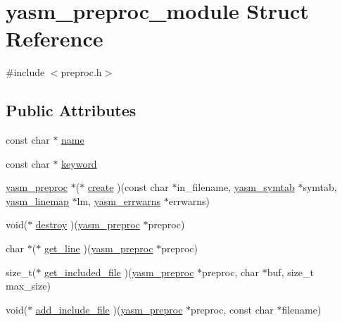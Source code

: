 \hypertarget{structyasm__preproc__module}{\section{yasm\-\_\-preproc\-\_\-module Struct Reference}
\label{structyasm__preproc__module}
}


{\ttfamily \#include $<$preproc.\-h$>$}

\subsection*{Public Attributes}
\begin{DoxyCompactItemize}
\item 
const char $\ast$ \hyperlink{structyasm__preproc__module_ae232113acc58ef454e6c6df75abc6ce7}{name}
\item 
const char $\ast$ \hyperlink{structyasm__preproc__module_ad37fee1370d76ddbcbea80b17be3fc83}{keyword}
\item 
\hyperlink{coretype_8h_aa84094d121bb4afca049e6c35efc2c92}{yasm\-\_\-preproc} $\ast$($\ast$ \hyperlink{structyasm__preproc__module_a685fc7d6db02337fde333a26ea43896b}{create} )(const char $\ast$in\-\_\-filename, \hyperlink{structyasm__symtab}{yasm\-\_\-symtab} $\ast$symtab, \hyperlink{structyasm__linemap}{yasm\-\_\-linemap} $\ast$lm, \hyperlink{structyasm__errwarns}{yasm\-\_\-errwarns} $\ast$errwarns)
\item 
void($\ast$ \hyperlink{structyasm__preproc__module_a17d6139fc57aa156c965953dec8a4541}{destroy} )(\hyperlink{coretype_8h_aa84094d121bb4afca049e6c35efc2c92}{yasm\-\_\-preproc} $\ast$preproc)
\item 
char $\ast$($\ast$ \hyperlink{structyasm__preproc__module_a90442c0082e89645360929798d9bfe80}{get\-\_\-line} )(\hyperlink{coretype_8h_aa84094d121bb4afca049e6c35efc2c92}{yasm\-\_\-preproc} $\ast$preproc)
\item 
size\-\_\-t($\ast$ \hyperlink{structyasm__preproc__module_aca1a9fb2898e43d42e9e130fa95327a2}{get\-\_\-included\-\_\-file} )(\hyperlink{coretype_8h_aa84094d121bb4afca049e6c35efc2c92}{yasm\-\_\-preproc} $\ast$preproc, char $\ast$buf, size\-\_\-t max\-\_\-size)
\item 
void($\ast$ \hyperlink{structyasm__preproc__module_a1ed21d1f8d493754bfdaeda11074baa2}{add\-\_\-include\-\_\-file} )(\hyperlink{coretype_8h_aa84094d121bb4afca049e6c35efc2c92}{yasm\-\_\-preproc} $\ast$preproc, const char $\ast$filename)
\item 

\end{DoxyCompactItemize}
